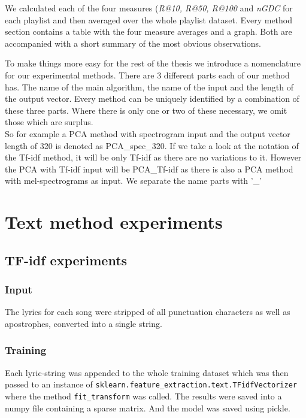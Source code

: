 We calculated each of the four measures (\textit{R@10, R@50, R@100} and \textit{nGDC} for each playlist and then averaged over the whole playlist dataset. Every method section contains a table with the four measure averages and a graph. Both are accompanied with a short summary of the most obvious observations.

To make things more easy for the rest of the thesis we introduce a nomenclature for our experimental methods. There are 3 different parts each of our method has. The name of the main algorithm, the name of the input and the length of the output vector. Every method can be uniquely identified by a combination of these three parts. Where there is only one or two of these necessary, we omit those which are surplus.\\
So for example a PCA method with spectrogram input and the output vector length of 320 is denoted as PCA\_spec\_320. If we take a look at the notation of the Tf-idf method, it will be only Tf-idf as there are no variations to it. However the PCA with Tf-idf input will be PCA\_Tf-idf as there is also a PCA method with mel-spectrograms as input. We separate the name parts with '\_' 

\section{Text method experiments}

\subsection{TF-idf experiments}\label{ssec:TF_idf}

\subsubsection{Input}
The lyrics for each song were stripped of all punctuation characters as well as apostrophes, converted into a single string. 
\subsubsection{Training}
Each lyric-string was appended to the whole training dataset which was then passed to an instance of \texttt{sklearn.feature\_extraction.text.TFidfVectorizer} where the method \texttt{fit\_transform} was called. The results were saved into a numpy file containing a sparse matrix. And the model was saved using pickle. \\

